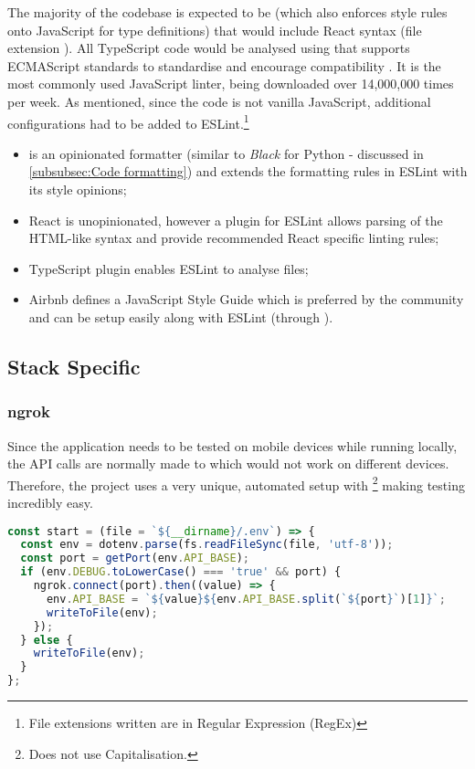 \documentclass[../main.tex]{subfiles}
\begin{document}
The majority of the codebase is expected to be  (which also enforces style rules onto JavaScript for type definitions) that would include React syntax (file extension ). All TypeScript code would be analysed using  that supports ECMAScript standards to standardise and encourage compatibility \cite{stefanov2010javascript,wirfs-brockJavaScriptFirst202020}. It is the most commonly used JavaScript linter, being downloaded over 14,000,000 times per week. As mentioned, since the code is not vanilla JavaScript, additional configurations had to be added to ESLint.\footnote{File extensions written are in Regular Expression (RegEx)}

\begin{itemize}
    \item {} is an opinionated formatter (similar to \textit{Black} for Python - discussed in \ref{subsubsec:Code formatting}) and extends the formatting rules in ESLint with its style opinions;
    \item React is unopinionated, however a plugin for ESLint allows parsing of the HTML-like syntax and provide recommended React specific linting rules;
    \item TypeScript plugin enables ESLint to analyse  files;
    \item Airbnb defines a JavaScript Style Guide \cite{AirbnbJavascriptJavaScript} which is preferred by the community and can be setup easily along with ESLint (through ).
\end{itemize}

\subsection{Stack Specific}

\subsubsection{ngrok}

Since the application needs to be tested on mobile devices while running locally, the API calls are normally made to  which would not work on different devices. Therefore, the project uses a very unique, automated setup with \footnote{Does not use Capitalisation.} making testing incredibly easy.

\begin{lstlisting}[language=javascript, caption={Automatic ngrok connection in \citecode{SrcSetenvJs}}]
const start = (file = `${__dirname}/.env`) => {
  const env = dotenv.parse(fs.readFileSync(file, 'utf-8'));
  const port = getPort(env.API_BASE);
  if (env.DEBUG.toLowerCase() === 'true' && port) {
    ngrok.connect(port).then((value) => {
      env.API_BASE = `${value}${env.API_BASE.split(`${port}`)[1]}`;
      writeToFile(env);
    });
  } else {
    writeToFile(env);
  }
};
\end{lstlisting}
\end{document}
